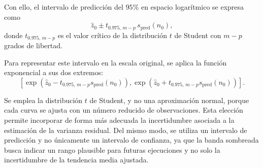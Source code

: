 Con ello, el intervalo de predicción del \(95\%\) en espacio logarítmico se expresa como
\[
\hat{z}_0
\pm
t_{0.975,\,m-p}\,s_{\mathrm{pred}}(n_0),
\]
donde \(t_{0.975,\,m-p}\) es el valor crítico de la distribución \(t\) de Student con
\(m-p\) grados de libertad.

Para representar este intervalo en la escala original, se aplica la función exponencial a sus
dos extremos:
\[
\left[
\exp\!\left(\hat{z}_0-t_{0.975,\,m-p}s_{\mathrm{pred}}(n_0)\right),
\exp\!\left(\hat{z}_0+t_{0.975,\,m-p}s_{\mathrm{pred}}(n_0)\right)
\right].
\]

Se emplea la distribución \(t\) de Student, y no una aproximación normal, porque cada curva
se ajusta con un número reducido de observaciones. Esta elección permite incorporar de forma
más adecuada la incertidumbre asociada a la estimación de la varianza residual. Del mismo
modo, se utiliza un intervalo de predicción y no únicamente un intervalo de confianza, ya que
la banda sombreada busca indicar un rango plausible para futuras ejecuciones y no solo la
incertidumbre de la tendencia media ajustada.
